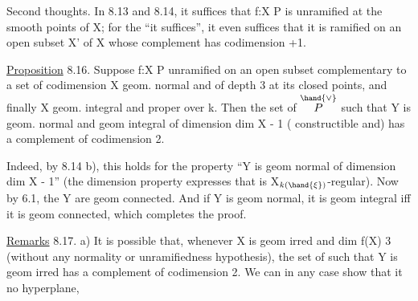 

Second thoughts. In 8.13 and 8.14, it suffices  that f:X\hand{$\to$} P is unramified
at the smooth points of X; for the “it suffices”, it even suffices
that it is ramified on an open subset X' of X whose complement has
codimension \hand{$\geqslant$} +1.

\uline{Proposition} 8.16. Suppose f:X\hand{$\to$} P unramified on an open subset
complementary to a set of codimension  X geom. normal and
of depth \hand{$\geqslant$} 3 at its closed points, and finally X geom. integral and proper
over k. Then the set of \hand{$\xi \in$} $\overset{\hand{\vee}}{P}$ such that 
Y\hand{$_\xi$} is geom. normal and geom integral of dimension dim X - 1 (
constructible and) has a complement of codimension \hand{$\geqslant$} 2.

Indeed, by 8.14 b), this holds for the property
“Y\hand{$_\xi$} is geom normal of dimension dim X - 1” (the dimension
property expresses that \hand{$\phi_\xi$} is X$_{k(\hand{\xi})}$-regular). Now by 6.1,
\uline{} the Y\hand{$_\xi$} are geom connected. And if Y\hand{$_\xi$} is geom normal, it is
geom integral iff it is geom connected, which completes the proof.

\uline{Remarks} 8.17. a)  It is possible that, whenever X is geom irred
and dim f(X) \hand{$\geqslant$} 3 (without any normality or unramifiedness hypothesis),
the set of \hand{$\xi$} such that Y\hand{$_\xi$} is geom irred has a complement
of codimension \hand{$\geqslant$}2. We can in any case show that it  no
hyperplane, 

